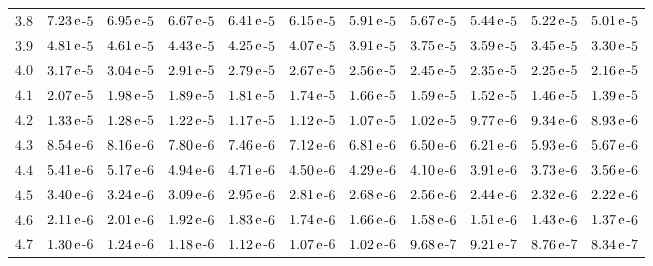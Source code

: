 \begin{table}[htb!]
\begin{center}
{\begin{tabular}{p{22 pt}cccccccccc}
$3.8$ & $7.23\,{\rm e}$-$5$ & $6.95\,{\rm e}$-$5$ & $6.67\,{\rm e}$-$5$ & $6.41\,{\rm e}$-$5$ & $6.15\,{\rm e}$-$5$ & $5.91\,{\rm e}$-$5$ & $5.67\,{\rm e}$-$5$ & $5.44\,{\rm e}$-$5$ & $5.22\,{\rm e}$-$5$ & $5.01\,{\rm e}$-$5$\\
$3.9$ & $4.81\,{\rm e}$-$5$ & $4.61\,{\rm e}$-$5$ & $4.43\,{\rm e}$-$5$ & $4.25\,{\rm e}$-$5$ & $4.07\,{\rm e}$-$5$ & $3.91\,{\rm e}$-$5$ & $3.75\,{\rm e}$-$5$ & $3.59\,{\rm e}$-$5$ & $3.45\,{\rm e}$-$5$ & $3.30\,{\rm e}$-$5$\\
$4.0$ & $3.17\,{\rm e}$-$5$ & $3.04\,{\rm e}$-$5$ & $2.91\,{\rm e}$-$5$ & $2.79\,{\rm e}$-$5$ & $2.67\,{\rm e}$-$5$ & $2.56\,{\rm e}$-$5$ & $2.45\,{\rm e}$-$5$ & $2.35\,{\rm e}$-$5$ & $2.25\,{\rm e}$-$5$ & $2.16\,{\rm e}$-$5$\\
$4.1$ & $2.07\,{\rm e}$-$5$ & $1.98\,{\rm e}$-$5$ & $1.89\,{\rm e}$-$5$ & $1.81\,{\rm e}$-$5$ & $1.74\,{\rm e}$-$5$ & $1.66\,{\rm e}$-$5$ & $1.59\,{\rm e}$-$5$ & $1.52\,{\rm e}$-$5$ & $1.46\,{\rm e}$-$5$ & $1.39\,{\rm e}$-$5$\\
$4.2$ & $1.33\,{\rm e}$-$5$ & $1.28\,{\rm e}$-$5$ & $1.22\,{\rm e}$-$5$ & $1.17\,{\rm e}$-$5$ & $1.12\,{\rm e}$-$5$ & $1.07\,{\rm e}$-$5$ & $1.02\,{\rm e}$-$5$ & $9.77\,{\rm e}$-$6$ & $9.34\,{\rm e}$-$6$ & $8.93\,{\rm e}$-$6$\\
$4.3$ & $8.54\,{\rm e}$-$6$ & $8.16\,{\rm e}$-$6$ & $7.80\,{\rm e}$-$6$ & $7.46\,{\rm e}$-$6$ & $7.12\,{\rm e}$-$6$ & $6.81\,{\rm e}$-$6$ & $6.50\,{\rm e}$-$6$ & $6.21\,{\rm e}$-$6$ & $5.93\,{\rm e}$-$6$ & $5.67\,{\rm e}$-$6$\\
$4.4$ & $5.41\,{\rm e}$-$6$ & $5.17\,{\rm e}$-$6$ & $4.94\,{\rm e}$-$6$ & $4.71\,{\rm e}$-$6$ & $4.50\,{\rm e}$-$6$ & $4.29\,{\rm e}$-$6$ & $4.10\,{\rm e}$-$6$ & $3.91\,{\rm e}$-$6$ & $3.73\,{\rm e}$-$6$ & $3.56\,{\rm e}$-$6$\\
$4.5$ & $3.40\,{\rm e}$-$6$ & $3.24\,{\rm e}$-$6$ & $3.09\,{\rm e}$-$6$ & $2.95\,{\rm e}$-$6$ & $2.81\,{\rm e}$-$6$ & $2.68\,{\rm e}$-$6$ & $2.56\,{\rm e}$-$6$ & $2.44\,{\rm e}$-$6$ & $2.32\,{\rm e}$-$6$ & $2.22\,{\rm e}$-$6$\\
$4.6$ & $2.11\,{\rm e}$-$6$ & $2.01\,{\rm e}$-$6$ & $1.92\,{\rm e}$-$6$ & $1.83\,{\rm e}$-$6$ & $1.74\,{\rm e}$-$6$ & $1.66\,{\rm e}$-$6$ & $1.58\,{\rm e}$-$6$ & $1.51\,{\rm e}$-$6$ & $1.43\,{\rm e}$-$6$ & $1.37\,{\rm e}$-$6$\\
$4.7$ & $1.30\,{\rm e}$-$6$ & $1.24\,{\rm e}$-$6$ & $1.18\,{\rm e}$-$6$ & $1.12\,{\rm e}$-$6$ & $1.07\,{\rm e}$-$6$ & $1.02\,{\rm e}$-$6$ & $9.68\,{\rm e}$-$7$ & $9.21\,{\rm e}$-$7$ & $8.76\,{\rm e}$-$7$ & $8.34\,{\rm e}$-$7$\\

\end{tabular}}
\end{center}
\end{table}
